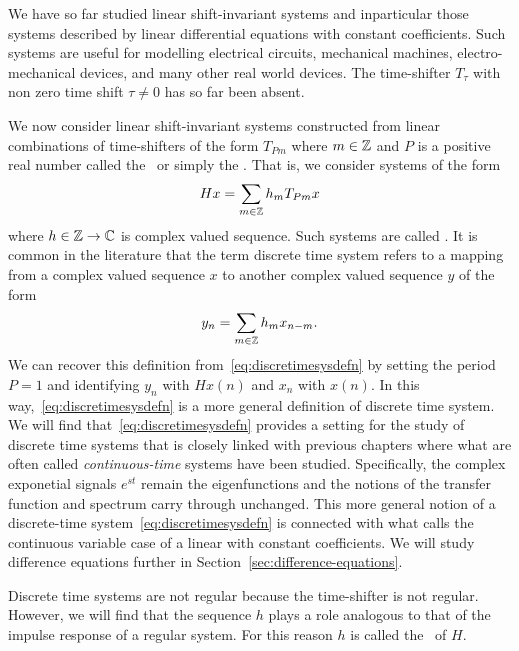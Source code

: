 We have so far studied linear shift-invariant systems and inparticular those systems described by linear differential equations with constant coefficients.  Such systems are useful for modelling electrical circuits, mechanical machines, electro-mechanical devices, and many other real world devices.  %
The time-shifter $T_\tau$ with non zero time shift $\tau \neq 0$ has so far been absent.  %

We now consider linear shift-invariant systems constructed from linear combinations of time-shifters of the form $T_{Pm}$ where $m \in {\mathbb Z}$ and $P$ is a positive real number called the~ or simply the .  That is, we consider systems of the form
\begin{equation}\label{eq:discretimesysdefn}
H x = \sum_{m \in {\mathbb Z}} h_m T_{ P m} x
\end{equation}
where $h \in {\mathbb Z} \to {\mathbb C}$ is complex valued sequence.  Such systems are called .  It is common in the literature that the term discrete time system refers to a mapping from a complex valued sequence $x$ to another complex valued sequence $y$ of the form
\[
y_n = \sum_{m \in {\mathbb Z}} h_m x_{n-m}.
\]
We can recover this definition from~\eqref{eq:discretimesysdefn} by setting the period $P = 1$ and identifying $y_n$ with $Hx(n)$ and $x_n$ with $x(n)$.  In this way,~\eqref{eq:discretimesysdefn} is a more general definition of discrete time system.  We will find that~\eqref{eq:discretimesysdefn} provides a setting for the study of discrete time systems that is closely linked with previous chapters where what are often called \emph{continuous-time} systems have been studied.  Specifically, the complex exponetial signals $e^{st}$ remain the eigenfunctions and the notions of the transfer function and spectrum carry through unchanged.  This more general notion of a discrete-time system~\eqref{eq:discretimesysdefn} is connected with what \citet[Sec.~9.5]{Zemanian_dist_theory_1965} calls the continuous variable case of a linear  with constant coefficients.  We will study difference equations further in Section~\ref{sec:difference-equations}.

Discrete time systems are not regular because the time-shifter is not regular.  However, we will find that the sequence $h$ plays a role analogous to that of the impulse response of a regular system.  For this reason $h$ is called the~ of $H$.


